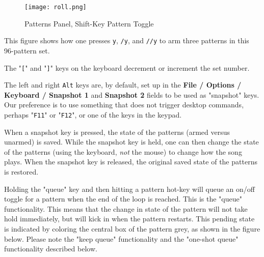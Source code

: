 \begin{figure}[H]
   \centering 
   \texttt{[image: roll.png]}
   \caption{Patterns Panel, Shift-Key Pattern Toggle}
   \label{fig:pattern_window_shift_key_pattern_toggle}
\end{figure}

   This figure shows how one presses \texttt{y}, \texttt{/y}, and \texttt{//y}
   to arm three patterns in this 96-pattern set.

   \index{keys![}
   The "\texttt{[}" and
   \index{keys!]}
   "\texttt{]}" keys on the keyboard decrement or increment the set number.

   The left and right \texttt{Alt} keys are, by default, set up in the
   \textbf{File / Options / Keyboard / Snapshot 1} and
   \textbf{Snapshot 2} fields to be used as "snapshot" keys.
   Our preference is to use something that does not trigger desktop
   commands, perhaps "\texttt{F11}" or "\texttt{F12}", or one of the keys in
   the keypad.

   When a snapshot key is pressed, the state of the patterns
   (armed versus unarmed) is saved.  While the
   snapshot key is held, one can then change the state of the patterns
   (using the keyboard, \textsl{not} the mouse)
   to change how the song plays.  When the snapshot key is released, the
   original saved state of the patterns is restored.



   Holding the "queue" key and then hitting a pattern hot-key
   will queue an on/off toggle for a pattern when the end of the loop is
   reached.
   This is the "queue" functionality.
   This means that the change in state of the pattern will not take hold
   immediately, but will kick in when the pattern restarts.
   This pending state is indicated by coloring the central box of the
   pattern grey, as shown in the figure below.
   Please note the "keep queue" functionality and
   the "one-shot queue" functionality described below.

